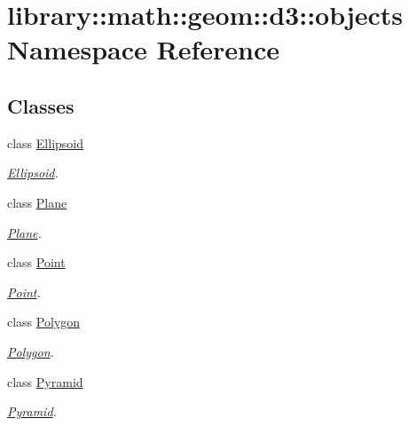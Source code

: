 \hypertarget{namespacelibrary_1_1math_1_1geom_1_1d3_1_1objects}{}\section{library\+:\+:math\+:\+:geom\+:\+:d3\+:\+:objects Namespace Reference}
\label{namespacelibrary_1_1math_1_1geom_1_1d3_1_1objects}
\subsection*{Classes}
\begin{DoxyCompactItemize}
\item 
class \hyperlink{classlibrary_1_1math_1_1geom_1_1d3_1_1objects_1_1_ellipsoid}{Ellipsoid}
\begin{DoxyCompactList}\small\item\em \hyperlink{classlibrary_1_1math_1_1geom_1_1d3_1_1objects_1_1_ellipsoid}{Ellipsoid}. \end{DoxyCompactList}\item 
class \hyperlink{classlibrary_1_1math_1_1geom_1_1d3_1_1objects_1_1_plane}{Plane}
\begin{DoxyCompactList}\small\item\em \hyperlink{classlibrary_1_1math_1_1geom_1_1d3_1_1objects_1_1_plane}{Plane}. \end{DoxyCompactList}\item 
class \hyperlink{classlibrary_1_1math_1_1geom_1_1d3_1_1objects_1_1_point}{Point}
\begin{DoxyCompactList}\small\item\em \hyperlink{classlibrary_1_1math_1_1geom_1_1d3_1_1objects_1_1_point}{Point}. \end{DoxyCompactList}\item 
class \hyperlink{classlibrary_1_1math_1_1geom_1_1d3_1_1objects_1_1_polygon}{Polygon}
\begin{DoxyCompactList}\small\item\em \hyperlink{classlibrary_1_1math_1_1geom_1_1d3_1_1objects_1_1_polygon}{Polygon}. \end{DoxyCompactList}\item 
class \hyperlink{classlibrary_1_1math_1_1geom_1_1d3_1_1objects_1_1_pyramid}{Pyramid}
\begin{DoxyCompactList}\small\item\em \hyperlink{classlibrary_1_1math_1_1geom_1_1d3_1_1objects_1_1_pyramid}{Pyramid}. \end{DoxyCompactList}\item 

\end{DoxyCompactItemize}
